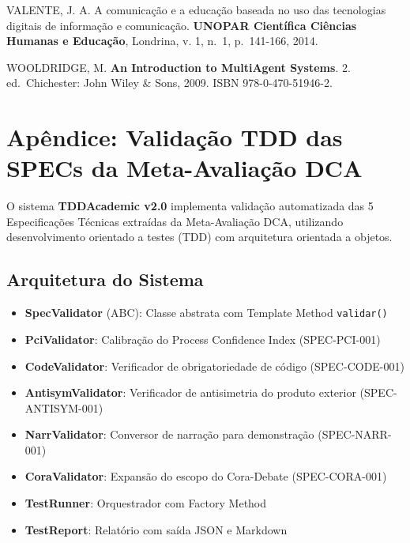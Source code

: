 \documentclass[
  brazilian,
  12pt,
]{article}
\begin{document}
VALENTE, J. A. A comunicação e a educação baseada no uso das tecnologias
digitais de informação e comunicação. \textbf{UNOPAR Científica Ciências
Humanas e Educação}, Londrina, v. 1, n.~1, p.~141-166, 2014.

WOOLDRIDGE, M. \textbf{An Introduction to MultiAgent Systems}. 2.
ed.~Chichester: John Wiley \& Sons, 2009. ISBN 978-0-470-51946-2.



\newpage
\section*{Apêndice: Validação TDD das SPECs da Meta-Avaliação DCA}

O sistema \textbf{TDDAcademic v2.0} implementa validação automatizada das 5 Especificações Técnicas extraídas da Meta-Avaliação DCA, utilizando desenvolvimento orientado a testes (TDD) com arquitetura orientada a objetos.

\subsection*{Arquitetura do Sistema}

\begin{itemize}
    \item \textbf{SpecValidator} (ABC): Classe abstrata com Template Method \texttt{validar()}
    \item \textbf{PciValidator}: Calibração do Process Confidence Index (SPEC-PCI-001)
    \item \textbf{CodeValidator}: Verificador de obrigatoriedade de código (SPEC-CODE-001)
    \item \textbf{AntisymValidator}: Verificador de antisimetria do produto exterior (SPEC-ANTISYM-001)
    \item \textbf{NarrValidator}: Conversor de narração para demonstração (SPEC-NARR-001)
    \item \textbf{CoraValidator}: Expansão do escopo do Cora-Debate (SPEC-CORA-001)
    \item \textbf{TestRunner}: Orquestrador com Factory Method
    \item \textbf{TestReport}: Relatório com saída JSON e Markdown
\end{itemize}
\end{document}
